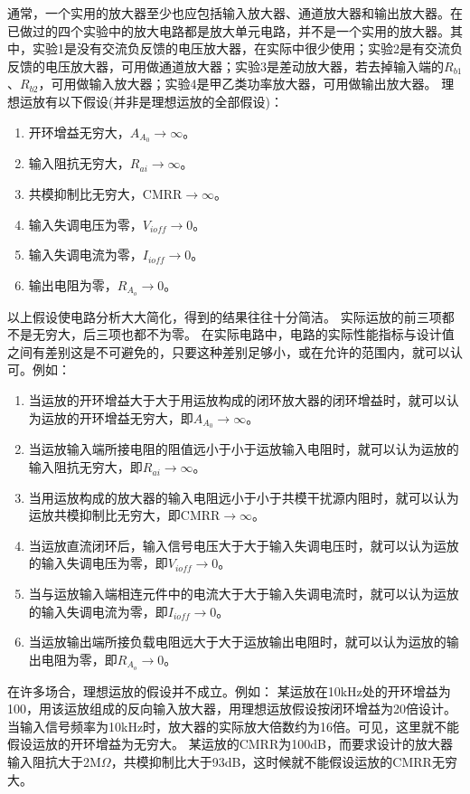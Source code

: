 \documentclass[a4paper]{article}
\begin{document}
通常，一个实用的放大器至少也应包括输入放大器、通道放大器和输出放大器。在已做过的四个实验中的放大电路都是放大单元电路，并不是一个实用的放大器。其中，实验1是没有交流负反馈的电压放大器，在实际中很少使用；实验2是有交流负反馈的电压放大器，可用做通道放大器；实验3是差动放大器，若去掉输入端的$R_{b1}$、$R_{b2}$，可用做输入放大器；实验4是甲乙类功率放大器，可用做输出放大器。
\newpage
理想运放有以下假设(并非是理想运放的全部假设)：
\begin{enumerate}
\item 开环增益无穷大，$A_{A_0}\to\infty$。
\item 输入阻抗无穷大，$R_{ai}\to\infty$。
\item 共模抑制比无穷大，CMRR$\to\infty$。
\item 输入失调电压为零，$V_{ioff}\to$0。
\item 输入失调电流为零，$I_{ioff}\to$0。
\item 输出电阻为零，$R_{A_o}\to$0。
\end{enumerate}
以上假设使电路分析大大简化，得到的结果往往十分简洁。
实际运放的前三项都不是无穷大，后三项也都不为零。
在实际电路中，电路的实际性能指标与设计值之间有差别这是不可避免的，只要这种差别足够小，或在允许的范围内，就可以认可。例如：
\begin{enumerate}
\item 当运放的开环增益大于大于用运放构成的闭环放大器的闭环增益时，就可以认为运放的开环增益无穷大，即$A_{A_0}\to\infty$。
\item 当运放输入端所接电阻的阻值远小于小于运放输入电阻时，就可以认为运放的输入阻抗无穷大，即$R_{ai}\to\infty$。
\item 当用运放构成的放大器的输入电阻远小于小于共模干扰源内阻时，就可以认为运放共模抑制比无穷大，即CMRR$\to\infty$。
\item 当运放直流闭环后，输入信号电压大于大于输入失调电压时，就可以认为运放的输入失调电压为零，即$V_{ioff}\to0$。
\item 当与运放输入端相连元件中的电流大于大于输入失调电流时，就可以认为运放的输入失调电流为零，即$I_{ioff}\to0$。
\item 当运放输出端所接负载电阻远大于大于运放输出电阻时，就可以认为运放的输出电阻为零，即$R_{A_o}\to0$。
\end{enumerate}
在许多场合，理想运放的假设并不成立。例如：
某运放在10kHz处的开环增益为100，用该运放组成的反向输入放大器，用理想运放假设按闭环增益为20倍设计。当输入信号频率为10kHz时，放大器的实际放大倍数约为16倍。可见，这里就不能假设运放的开环增益为无穷大。
某运放的CMRR为100dB，而要求设计的放大器输入阻抗大于2M$\Omega$，共模抑制比大于93dB，这时候就不能假设运放的CMRR无穷大。
\end{document}
